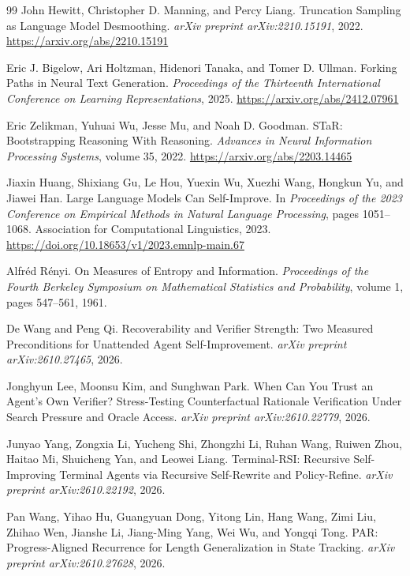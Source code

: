 \documentclass[11pt]{article}
\begin{document}
\begin{thebibliography}{99}
John Hewitt, Christopher D. Manning, and Percy Liang.
\newblock Truncation Sampling as Language Model Desmoothing.
\newblock \emph{arXiv preprint arXiv:2210.15191}, 2022.
\newblock \url{https://arxiv.org/abs/2210.15191}

Eric J. Bigelow, Ari Holtzman, Hidenori Tanaka, and Tomer D. Ullman.
\newblock Forking Paths in Neural Text Generation.
\newblock \emph{Proceedings of the Thirteenth International Conference
on Learning Representations}, 2025.
\newblock \url{https://arxiv.org/abs/2412.07961}

Eric Zelikman, Yuhuai Wu, Jesse Mu, and Noah D. Goodman.
\newblock STaR: Bootstrapping Reasoning With Reasoning.
\newblock \emph{Advances in Neural Information Processing Systems},
volume 35, 2022.
\newblock \url{https://arxiv.org/abs/2203.14465}

Jiaxin Huang, Shixiang Gu, Le Hou, Yuexin Wu, Xuezhi Wang,
Hongkun Yu, and Jiawei Han.
\newblock Large Language Models Can Self-Improve.
\newblock In \emph{Proceedings of the 2023 Conference on Empirical
Methods in Natural Language Processing}, pages 1051--1068.
Association for Computational Linguistics, 2023.
\newblock \url{https://doi.org/10.18653/v1/2023.emnlp-main.67}

Alfr\'ed R\'enyi.
\newblock On Measures of Entropy and Information.
\newblock \emph{Proceedings of the Fourth Berkeley Symposium on
Mathematical Statistics and Probability}, volume 1, pages 547--561,
1961.

De Wang and Peng Qi.
\newblock Recoverability and Verifier Strength: Two Measured Preconditions
for Unattended Agent Self-Improvement.
\newblock \emph{arXiv preprint arXiv:2610.27465}, 2026.

Jonghyun Lee, Moonsu Kim, and Sunghwan Park.
\newblock When Can You Trust an Agent's Own Verifier? Stress-Testing Counterfactual Rationale Verification Under Search Pressure and Oracle Access.
\newblock \emph{arXiv preprint arXiv:2610.22779}, 2026.

Junyao Yang, Zongxia Li, Yucheng Shi, Zhongzhi Li, Ruhan Wang, Ruiwen Zhou,
Haitao Mi, Shuicheng Yan, and Leowei Liang.
\newblock Terminal-RSI: Recursive Self-Improving Terminal Agents via Recursive Self-Rewrite and Policy-Refine.
\newblock \emph{arXiv preprint arXiv:2610.22192}, 2026.

Pan Wang, Yihao Hu, Guangyuan Dong, Yitong Lin, Hang Wang, Zimi Liu,
Zhihao Wen, Jianshe Li, Jiang-Ming Yang, Wei Wu, and Yongqi Tong.
\newblock PAR: Progress-Aligned Recurrence for Length Generalization in
State Tracking.
\newblock \emph{arXiv preprint arXiv:2610.27628}, 2026.

\end{thebibliography}
\end{document}
